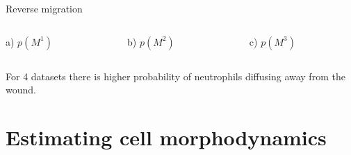 \documentclass[mathserif,11pt]{beamer}
\begin{document}
\begin{frame}{Reverse migration}
\begin{columns}
	\centering
	\begin{column}{0.31\textwidth}
		\centering
		\footnotesize{ a) $p(M^1)$}
	\end{column}
	\begin{column}{0.31\textwidth}
		\centering
		\footnotesize{ b)  $p(M^2)$}
	\end{column}
	\begin{column}{0.31\textwidth}
		\centering
		\footnotesize{ c)  $p(M^3)$}
	\end{column}
\end{columns}
\vspace{0.5cm}
For 4 datasets there is higher probability of neutrophils diffusing away from the wound.
\end{frame}

\section{Estimating cell morphodynamics}
\end{document}
